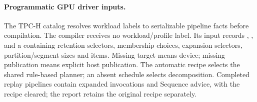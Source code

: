 \paragraph{Programmatic GPU driver inputs.}
The TPC-H catalog resolves workload labels to serializable pipeline facts before
compilation. The compiler receives no workload/profile label. Its input records
, , and a
 containing retention selectors, membership choices, expansion
selectors, partition/segment sizes and items. Missing target means device;
missing publication means explicit host publication. The automatic recipe
selects the shared rule-based planner; an absent schedule selects decomposition.
Completed replay pipelines contain expanded invocations and Sequence advice,
with the recipe cleared; the report retains the original recipe separately.
